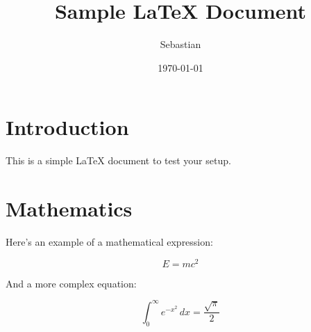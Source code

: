 \documentclass{article}
\begin{document}
\title{Sample LaTeX Document}
\author{Sebastian}
\date{\today}

\maketitle

\section{Introduction}

This is a simple LaTeX document to test your setup.

\section{Mathematics}

Here’s an example of a mathematical expression:

\[
E = mc^2
\]

And a more complex equation:

\[
\int_{0}^{\infty} e^{-x^2} \, dx = \frac{\sqrt{\pi}}{2}
\]
\end{document}
